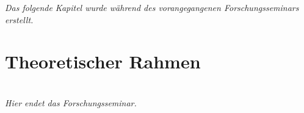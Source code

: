 \textit{Das folgende Kapitel wurde während des vorangegangenen Forschungsseminars erstellt.}
\section{Theoretischer Rahmen}\label{forschungsseminar}




\\
\textit{Hier endet das Forschungsseminar.}


